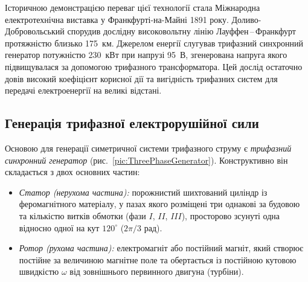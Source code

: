 Історичною демонстрацією переваг цієї технології стала Міжнародна електротехнічна виставка у Франкфурті-на-Майні 1891 року. Доливо-Добровольський спорудив дослідну високовольтну лінію Лауффен\,--\,Франкфурт протяжністю близько 175~км. Джерелом енергії слугував трифазний синхронний генератор потужністю 230~кВт при напрузі 95~В, згенерована напруга якого підвищувалася за допомогою трифазного трансформатора. Цей дослід остаточно довів високий коефіцієнт корисної дії та вигідність трифазних систем для передачі електроенергії на великі відстані.

\subsection*{Генерація трифазної електрорушійної сили}

Основою для генерації симетричної системи трифазного струму є \emph{трифазний синхронний генератор} (рис.~\ref{pic:ThreePhaseGenerator}). Конструктивно він складається з двох основних частин:
\begin{itemize}
    \item \emph{Статор (нерухома частина):} порожнистий шихтований циліндр із феромагнітного матеріалу, у пазах якого розміщені три однакові за будовою та кількістю витків обмотки (фази $I$, $II$, $III$), просторово зсунуті одна відносно одної на кут $120^\circ$ ($2\pi/3$ рад).
    \item \emph{Ротор (рухома частина):} електромагніт або постійний магніт, який створює постійне за величиною магнітне поле та обертається із постійною кутовою швидкістю $\omega$ від зовнішнього первинного двигуна (турбіни).
\end{itemize}

